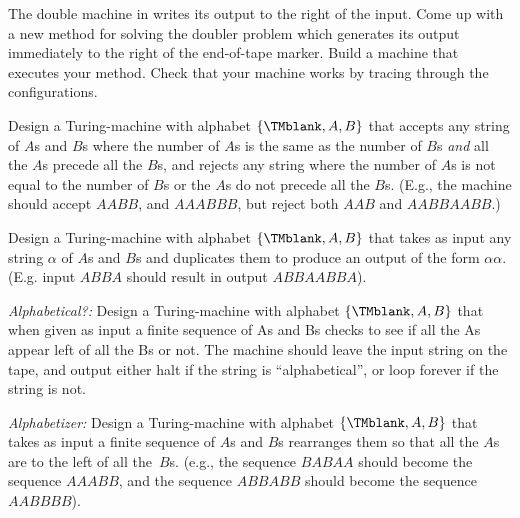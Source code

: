 \documentclass[../../../include/open-logic-section]{subfiles}
\begin{document}
\begin{prob}
  The double machine in  writes its output to the
  right of the input.  Come up with a new method for solving the
  doubler problem which generates its output immediately to the right
  of the end-of-tape marker. Build a machine that executes your
  method. Check that your machine works by tracing through the
  configurations.
\end{prob}

\begin{prob}
Design a Turing-machine with alphabet $\{\TMblank, A, B\}$ that
accepts any string of $A$s and $B$s where the number of $A$s is the
same as the number of $B$s \emph{and} all the $A$s precede all the
$B$s, and rejects any string where the number of $A$s is not equal to
the number of $B$s or the $A$s do not precede all the $B$s. (E.g., the
machine should accept $AABB$, and $AAABBB$, but reject both $AAB$ and
$AABBAABB$.)
\end{prob}

\begin{prob}
Design a Turing-machine with alphabet $\{\TMblank, A, B\}$ that takes
as input any string $\alpha$ of $A$s and $B$s and duplicates them to
produce an output of the form $\alpha\alpha$. (E.g. input $ABBA$
should result in output $ABBAABBA$).
\end{prob}

\begin{prob}
\emph{Alphabetical?:} Design a Turing-machine with alphabet
$\{\TMblank, A, B\}$ that when given as input a finite sequence of As
and Bs checks to see if all the As appear left of all the Bs or
not. The machine should leave the input string on the tape, and output
either halt if the string is ``alphabetical'', or loop forever if the
string is not.
\end{prob}

\begin{prob}
\emph{Alphabetizer:} Design a Turing-machine with alphabet
$\{\TMblank, A, B\}$ that takes as input a finite sequence of $A$s and
$B$s rearranges them so that all the $A$s are to the left of all
the~$B$s. (e.g., the sequence $BABAA$ should become the sequence
$AAABB$, and the sequence $ABBABB$ should become the sequence
$AABBBB$).
\end{prob}
\end{document}
